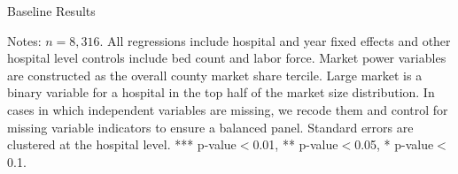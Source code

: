 \documentclass[12pt]{article}
\begin{document}
\setlength{\captionmargin}{.5 \textwidth} \addtolength{\captionmargin}{-.5\wd\gfxbox}
\begin{table}[!h]
\centering
\caption{Baseline Results}
\label{tab:baselineresults}
\usebox{\gfxbox}
\par
\begin{minipage}{\wd\gfxbox}
\footnotesize
Notes: $n=8,316$.  All regressions include hospital and year fixed effects and other hospital level controls include bed count and labor force.  Market power variables are constructed as the overall county market share tercile.  Large market is a binary variable for a hospital in the top half of the market size distribution.  In cases in which independent variables are missing, we recode them and control for missing variable indicators to ensure a balanced panel.  Standard errors are clustered at the hospital level.  *** p-value$<$0.01, ** p-value$<$0.05, * p-value$<$0.1.
\end{minipage}
\end{table}
\end{document}

